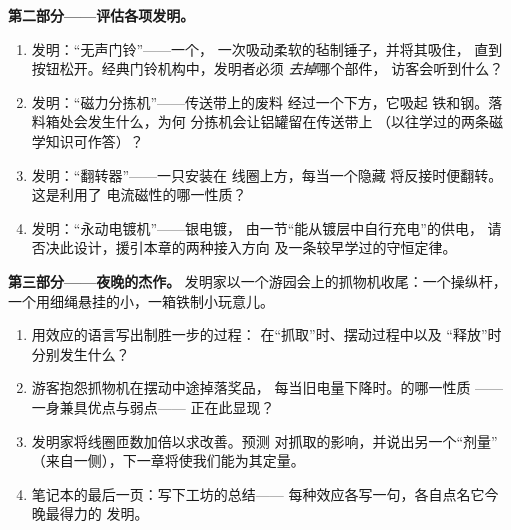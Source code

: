 \begin{problem}
\medskip\noindent\textbf{第二部分——评估各项发明。}
\begin{enumerate}[resume]
  \item 发明：“无声门铃”——一个，
        一次吸动柔软的毡制锤子，并将其吸住，
        直到按钮松开。经典门铃机构中，发明者必须
        \emph{去掉}哪个部件，
        访客会听到什么？
  \item 发明：“磁力分拣机”——传送带上的废料
        经过一个下方，它吸起
        铁和钢。落料箱处会发生什么，为何
        分拣机会让铝罐留在传送带上
        （以往学过的两条磁学知识可作答）？
  \item 发明：“翻转器”——一只安装在
        线圈上方，每当一个隐藏
        将反接时便翻转。这是利用了
        电流磁性的哪一性质？
  \item 发明：“永动电镀机”——银电镀，
        由一节“能从镀层中自行充电”的供电，
        请否决此设计，援引本章的两种接入方向
        及一条较早学过的守恒定律。
\end{enumerate}

\medskip\noindent\textbf{第三部分——夜晚的杰作。}
发明家以一个游园会上的抓物机收尾：一个操纵杆，
一个用细绳悬挂的小，一箱铁制小玩意儿。
\begin{enumerate}[resume]
  \item 用效应的语言写出制胜一步的过程：
        在“抓取”时、摆动过程中以及
        “释放”时分别发生什么？
  \item 游客抱怨抓物机在摆动中途掉落奖品，
        每当旧电量下降时。的哪一性质
        ——一身兼具优点与弱点——
        正在此显现？
  \item 发明家将线圈匝数加倍以求改善。预测
        对抓取的影响，并说出另一个“剂量”
        （来自一侧），下一章将使我们能为其定量。
  \item 笔记本的最后一页：写下工坊的总结——
        每种效应各写一句，各自点名它今晚最得力的
        发明。
\end{enumerate}
\end{problem}
